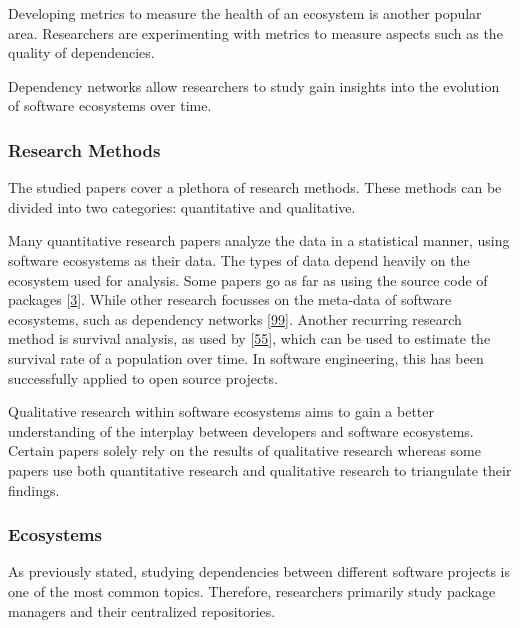 \documentclass[]{book}
\begin{document}
Developing metrics to measure the health of an ecosystem is another
popular area. Researchers are experimenting with metrics to measure
aspects such as the quality of dependencies.

Dependency networks allow researchers to study gain insights into the
evolution of software ecosystems over time.

\subsubsection{Research Methods}\label{research-methods}

The studied papers cover a plethora of research methods. These methods
can be divided into two categories: quantitative and qualitative.

Many quantitative research papers analyze the data in a statistical
manner, using software ecosystems as their data. The types of data
depend heavily on the ecosystem used for analysis. Some papers go as far
as using the source code of packages
{[}\protect\hyperlink{ref-Abdalkareem2017}{3}{]}. While other research
focusses on the meta-data of software ecosystems, such as dependency
networks {[}\protect\hyperlink{ref-Kikas2017}{99}{]}. Another recurring
research method is survival analysis, as used by
{[}\protect\hyperlink{ref-Decan2018}{55}{]}, which can be used to
estimate the survival rate of a population over time. In software
engineering, this has been successfully applied to open source projects.

Qualitative research within software ecosystems aims to gain a better
understanding of the interplay between developers and software
ecosystems. Certain papers solely rely on the results of qualitative
research whereas some papers use both quantitative research and
qualitative research to triangulate their findings.

\subsubsection{Ecosystems}\label{ecosystems}

As previously stated, studying dependencies between different software
projects is one of the most common topics. Therefore, researchers
primarily study package managers and their centralized repositories.
\end{document}
